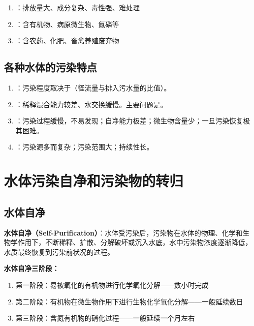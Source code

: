 \documentclass[10pt,a4paper,oneside]{ctexbook}
\begin{document}
\begin{enumerate}[leftmargin=*]
    \item {}：排放量大、成分复杂、毒性强、难处理
    \item {}：含有机物、病原微生物、氮磷等
    \item {}：含农药、化肥、畜禽养殖废弃物
\end{enumerate}

\subsection{各种水体的污染特点}

\begin{keybox}
\begin{enumerate}[leftmargin=*]
    \item {}：污染程度取决于（径流量与排入污水量的比值）。
    \item {}：稀释混合能力较差、水交换缓慢。主要问题是。
    \item {}：污染过程缓慢，不易发现；自净能力极差；微生物含量少；一旦污染恢复极其困难。
    \item {}：污染源多而复杂；污染范围大；持续性长。
\end{enumerate}
\end{keybox}

\section{水体污染自净和污染物的转归}

\subsection{水体自净}

\begin{defbox}
\textbf{水体自净（Self-Purification）}：水体受污染后，污染物在水体的物理、化学和生物学作用下，不断稀释、扩散、分解破坏或沉入水底，水中污染物浓度逐渐降低，水质最终恢复到污染前状况的过程。
\end{defbox}

\textbf{水体自净三阶段：}
\begin{enumerate}[leftmargin=*]
    \item 第一阶段：易被氧化的有机物进行化学氧化分解——数小时完成
    \item 第二阶段：有机物在微生物作用下进行生物化学氧化分解——一般延续数日
    \item 第三阶段：含氮有机物的硝化过程——一般延续一个月左右
\end{enumerate}
\end{document}
